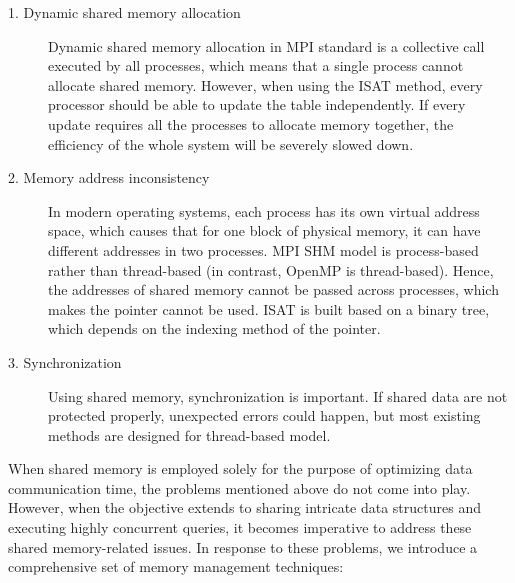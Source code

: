 \begin{description}
\item [1. Dynamic shared memory allocation] Dynamic shared memory allocation in MPI standard is a collective call executed by all processes, which means that a single process cannot allocate shared memory. However, when using the ISAT method, every processor should be able to update the table independently. If every update requires all the processes to allocate memory together, the efficiency of the whole system will be severely slowed down.
  \item [2. Memory address inconsistency] In modern operating systems, each process has its own virtual address space, which causes that for one block of physical memory, it can have different addresses in two processes. MPI SHM model is process-based rather than thread-based (in contrast, OpenMP is thread-based). Hence, the addresses of shared memory cannot be passed across processes, which makes the pointer cannot be used. ISAT is built based on a binary tree, which depends on the indexing method of the pointer. 
  \item [3. Synchronization] Using shared memory, synchronization is important. If shared data are not protected properly, unexpected errors could happen, but most existing methods are designed for thread-based model. 
\end{description}


When shared memory is employed solely for the purpose of optimizing data communication time, the problems mentioned above do not come into play. However, when the objective extends to sharing intricate data structures and executing highly concurrent queries, it becomes imperative to address these shared memory-related issues. In response to these problems, we introduce a comprehensive set of memory management techniques:



